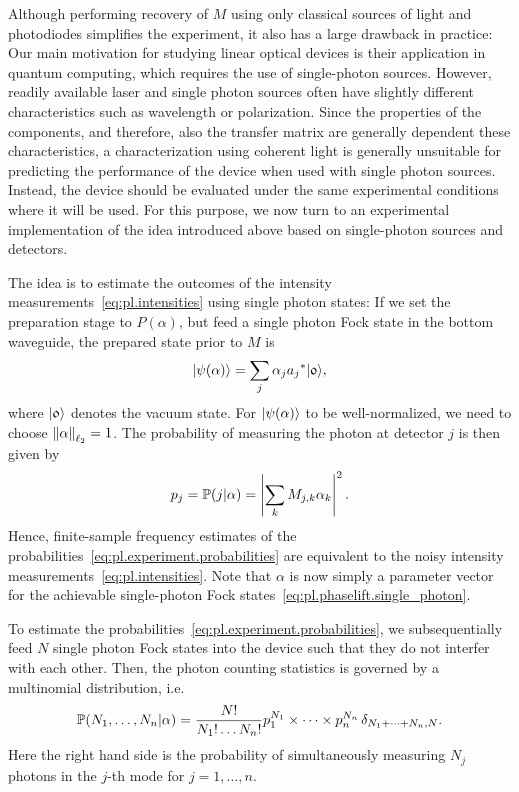 Although performing recovery of $M$ using only classical sources of light and photodiodes simplifies the experiment, it also has a large drawback in practice:
Our main motivation for studying linear optical devices is their application in quantum computing, which requires the use of single-photon sources.
However, readily available laser and single photon sources often have slightly different characteristics such as wavelength or polarization.
Since the properties of the components, and therefore, also the transfer matrix are generally dependent these characteristics, a characterization using coherent light is generally unsuitable for predicting the performance of the device when used with single photon sources.
Instead, the device should be evaluated under the same experimental conditions where it will be used.
For this purpose, we now turn to an experimental implementation of the idea introduced above based on single-photon sources and detectors.

The idea is to estimate the outcomes of the intensity measurements~\eqref{eq:pl.intensities} using single photon states:
If we set the preparation stage to $P(\alpha)$, but feed a single photon Fock state in the bottom waveguide, the prepared state prior to $M$ is
\[
  \label{eq:pl.phaselift.single_photon}
  \ket{\psi({\alpha})} = \sum_j \alpha_j \adj{a_j} \ket{\mathfrak{0}},
\]
where $\ket{\mathfrak{0}}$ denotes the vacuum state.
For $\ket{{\psi(\alpha)}}$ to be well-normalized, we need to choose ${\Vert\alpha\Vert}_{\ell_2} = 1$.
The probability of measuring the photon at detector $j$ is then given by
\[
  p_j = \mathbb{P}(j|{\alpha}) = \left| \sum_k M_{j,k} \alpha_k \right|^2.
  \label{eq:pl.experiment.probabilities}
\]
Hence, finite-sample frequency estimates of the probabilities~\eqref{eq:pl.experiment.probabilities} are equivalent to the noisy intensity measurements~\eqref{eq:pl.intensities}.
Note that $\alpha$ is now simply a parameter vector for the achievable single-photon Fock states~\eqref{eq:pl.phaselift.single_photon}.

To estimate the probabilities~\eqref{eq:pl.experiment.probabilities}, we subsequentially feed $N$ single photon Fock states into the device such that they do not interfer with each other.
Then, the photon counting statistics is governed by a multinomial distribution, i.e.
\[
\mathbb{P}(N_1, \ldots, N_n | \alpha) = \frac{N!}{N_1! \ldots N_n!}  p_1^{N_1} \times \cdots \times p_n^{N_n}  \, \delta_{N_1 + \cdots + N_n, N}.
  \label{eq:pl.photon_stats}
\]
Here the right hand side is the probability of simultaneously measuring $N_j$ photons in the $j$-th mode for $j=1,\ldots,n$.



